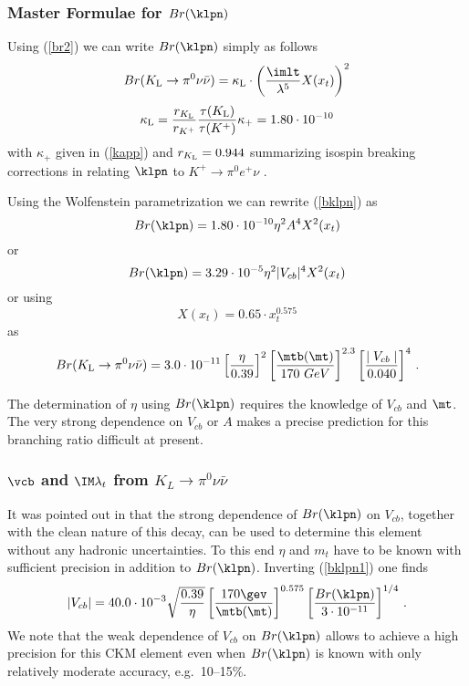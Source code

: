 \subsubsection{Master Formulae for $Br(\klpn)$}
\label{sec:Kpnn:MasterKL}
Using (\ref{br2}) we can write $Br(\klpn)$ simply as
follows
\begin{equation}\label{bklpn}
Br(K_{\rm L}\to\pi^0\nu\bar\nu)=\kappa_{\rm L}\cdot
\left({\imlt\over\lambda^5}X(x_t)\right)^2
\end{equation}
\begin{equation}\label{kapl}
\kappa_{\rm L}=\frac{r_{K_{\rm L}}}{r_{K^+}}
 {\tau(K_{\rm L})\over\tau(K^+)}\kappa_+ =1.80\cdot 10^{-10}
\end{equation}
with $\kappa_+$ given in (\ref{kapp}) and
$r_{K_{\rm L}}=0.944$ summarizing isospin
breaking corrections in relating $\klpn$ to $K^+\to\pi^0e^+\nu$
\cite{MP}.

Using the Wolfenstein
parametrization we can rewrite (\ref{bklpn}) as
\begin{equation}\label{bklpnwol1}
Br(\klpn)=1.80\cdot 10^{-10} \eta^2 A^4 X^2(x_t)
\end{equation}
or
\begin{equation}\label{bklpnwol2}
Br(\klpn)=3.29\cdot 10^{-5} \eta^2 |V_{cb}|^4 X^2(x_t)
\end{equation}
or using 
\begin{equation}\label{xxappr}
X(x_t)=0.65\cdot x_t^{0.575}
\end{equation}
as
\begin{equation}
Br(K_{\rm L}\to\pi^0\nu\bar\nu)=
3.0\cdot 10^{-11}
\left [ \frac{\eta}{0.39}\right ]^2
\left [\frac{\mtb(\mt)}{170~GeV} \right ]^{2.3} 
\left [\frac{\mid V_{cb}\mid}{0.040} \right ]^4 \,.
\label{bklpn1}
\end{equation}

The determination of $\eta$ using $Br(\klpn)$ requires the knowledge
of $V_{cb}$ and $\mt$. The very strong dependence on $V_{cb}$ or $A$
makes a precise prediction for this branching ratio difficult at
present.

\subsubsection{$\vcb$ and $\IM \lambda_t$  from $K_L\to\pi^0\nu\bar\nu$}
It was pointed out in \cite{AJB94} that the strong
dependence of $Br(\klpn)$ on $V_{cb}$, together with the clean nature of
this decay, can be used to determine this element without any hadronic
uncertainties. To this end $\eta$ and $m_t$ have to be known with
sufficient precision in addition to $Br(\klpn)$. 
Inverting (\ref{bklpn1})
one finds
\begin{equation}\label{vcbklpn}
|V_{cb}|=40.0\cdot 10^{-3} \sqrt{\frac{0.39}{\eta}}
\left[\frac{170\gev}{\mtb(\mt)}\right]^{0.575}
\left[\frac{Br(\klpn)}{3\cdot 10^{-11}}\right]^{1/4}\,.
\end{equation}
We note that the weak dependence of $V_{cb}$ on $Br(\klpn)$ allows
to achieve a high precision for this CKM element even when $Br(\klpn)$
is known with only relatively moderate accuracy, e.g.\ 10--15\%.

